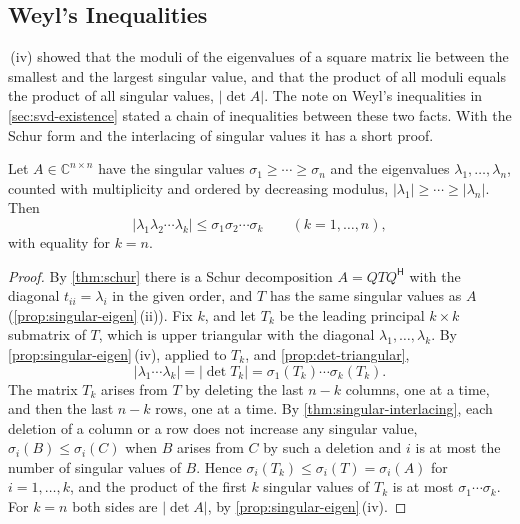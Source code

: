 \subsection{Weyl's Inequalities}

\,(iv) showed that the moduli of the eigenvalues of a square matrix lie between the smallest and the largest singular value, and that the product of all moduli equals the product of all singular values, $|\det A|$. The note on Weyl's inequalities in \cref{sec:svd-existence} stated a chain of inequalities between these two facts. With the Schur form and the interlacing of singular values it has a short proof.

\begin{theorem}
\label{thm:weyl-product}
Let $A\in\mathbb C^{n\times n}$ have the singular values $\sigma_1\ge\cdots\ge\sigma_n$ and the eigenvalues $\lambda_1,\ldots,\lambda_n$, counted with multiplicity and ordered by decreasing modulus, $|\lambda_1|\ge\cdots\ge|\lambda_n|$. Then
\[
|\lambda_1\lambda_2\cdots\lambda_k|\le\sigma_1\sigma_2\cdots\sigma_k\qquad(k=1,\ldots,n),
\]
with equality for $k=n$.
\end{theorem}

\begin{proof}
By \cref{thm:schur} there is a Schur decomposition $A=QTQ^{\mathsf H}$ with the diagonal $t_{ii}=\lambda_i$ in the given order, and $T$ has the same singular values as $A$ (\cref{prop:singular-eigen}\,(ii)). Fix $k$, and let $T_k$ be the leading principal $k\times k$ submatrix of $T$, which is upper triangular with the diagonal $\lambda_1,\ldots,\lambda_k$. By \cref{prop:singular-eigen}\,(iv), applied to $T_k$, and \cref{prop:det-triangular},
\[
|\lambda_1\cdots\lambda_k|=|\det T_k|=\sigma_1(T_k)\cdots\sigma_k(T_k).
\]
The matrix $T_k$ arises from $T$ by deleting the last $n-k$ columns, one at a time, and then the last $n-k$ rows, one at a time. By \cref{thm:singular-interlacing}, each deletion of a column or a row does not increase any singular value, $\sigma_i(B)\le\sigma_i(C)$ when $B$ arises from $C$ by such a deletion and $i$ is at most the number of singular values of $B$. Hence $\sigma_i(T_k)\le\sigma_i(T)=\sigma_i(A)$ for $i=1,\ldots,k$, and the product of the first $k$ singular values of $T_k$ is at most $\sigma_1\cdots\sigma_k$. For $k=n$ both sides are $|\det A|$, by \cref{prop:singular-eigen}\,(iv).
\end{proof}

